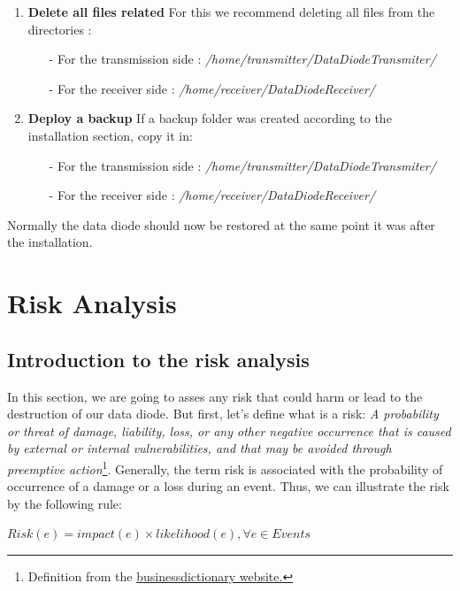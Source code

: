 \documentclass[a4paper,10pt]{article}
\begin{document}
\begin{enumerate}
\item \textbf{Delete all files related}
	For this we recommend deleting all files from the directories  :
\begin{enumerate}
\item[-] For the transmission side : \emph{/home/transmitter/DataDiodeTransmiter/}
\item[-] For the receiver side : \emph{/home/receiver/DataDiodeReceiver/}
\end{enumerate}

\item \textbf{Deploy a backup} 
If a backup folder was created according to the installation section, copy it in:
\begin{enumerate}
\item[-] For the transmission side : \emph{/home/transmitter/DataDiodeTransmiter/}
\item[-] For the receiver side : \emph{/home/receiver/DataDiodeReceiver/}
\end{enumerate}

\end{enumerate}
Normally the data diode should now be restored at the same point it was after the installation.
\bigskip

\newpage
\section{Risk Analysis}

\subsection{Introduction to the risk analysis}
In this section, we are going to asses any risk that could harm or lead to the destruction of our data diode. But first, let's define what is a risk: \emph{A probability or threat of damage, liability, loss, or any other negative occurrence that is caused by external or internal vulnerabilities, and that may be avoided through preemptive action}\footnote{Definition from the \href{http://www.businessdictionary.com/definition/risk.html}{businessdictionary website.}}. Generally, the term risk is associated with the probability of occurrence of a damage or a loss during an event. Thus, we can illustrate the risk by the following rule:
\begin{center}
\centering
$Risk(e)= impact(e) \times likelihood(e), \forall e \in Events$
\end{center}
\end{document}
